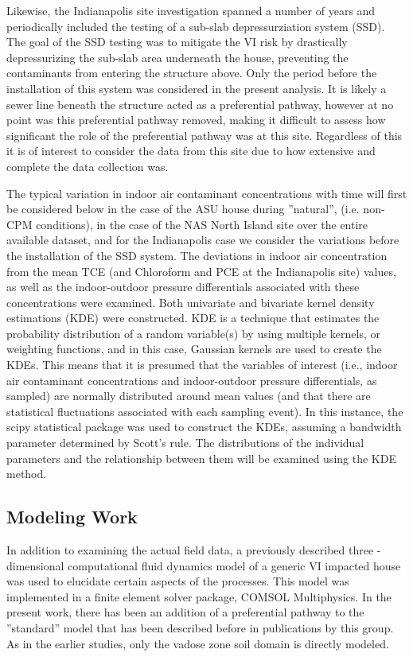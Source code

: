 \documentclass[journal=esthag,manuscript=article]{achemso}
\begin{document}
Likewise, the Indianapolis site investigation spanned a number of years and periodically included the testing of a sub-slab depressurziation system (SSD).
The goal of the SSD testing was to mitigate the VI risk by drastically depressurizing the sub-slab area underneath the house, preventing the contaminants from entering the structure above.
Only the period before the installation of this system was considered in the present analysis.
It is likely a sewer line beneath the structure acted as a preferential pathway\cite{mchugh_evidence_2017}, however at no point was this preferential pathway removed, making it difficult to assess how significant the role of the preferential pathway was at this site.
Regardless of this it is of interest to consider the data from this site due to how extensive and complete the data collection was. \par

The typical variation in indoor air contaminant concentrations with time will first be considered below in the case of the ASU house during ”natural”, (i.e. non-CPM conditions), in the case of the NAS North Island site over the entire available dataset, and for the Indianapolis case we consider the variations before the installation of the SSD system.
The deviations in indoor air concentration from the mean TCE (and Chloroform and PCE at the Indianapolis site) values, as well as the indoor-outdoor pressure differentials associated with these concentrations were examined.
Both univariate and bivariate kernel density estimations (KDE) were constructed.
KDE is a technique that estimates the probability distribution of a random variable(s) by using multiple kernels, or weighting functions, and in this case, Gaussian kernels are used to create the KDEs.
This means that it is presumed that the variables of interest (i.e., indoor air contaminant concentrations and indoor-outdoor pressure differentials, as sampled) are normally distributed around mean values (and that there are statistical fluctuations associated with each sampling event).
In this instance, the scipy statistical package was used to construct the KDEs, assuming a bandwidth parameter determined by Scott's rule.
The distributions of the individual parameters and the relationship between them will be examined using the KDE method.

\subsection{Modeling Work}
In addition to examining the actual field data, a previously described three -dimensional computational fluid dynamics model of a generic VI impacted house was used to elucidate certain aspects of  the processes.
This model was implemented in a finite element solver package, COMSOL Multiphysics.
In the present work, there has been an addition of a preferential pathway to the ”standard” model that has been described before in publications by this group\cite{shen_influence_2013,yao_investigating_2017,yao_three-dimensional_2017}.
As in the earlier studies, only the vadose zone soil domain is directly modeled.
\end{document}

